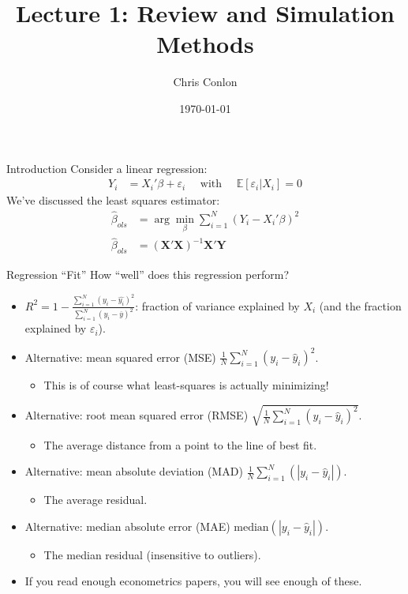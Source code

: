 \documentclass[aspectratio=169]{beamer}
\title{Lecture 1: Review and Simulation Methods}
\author{Chris Conlon }
\institute{NYU Stern }
\date{\today}
\begin{document}
\maketitle

\begin{frame}{Introduction}
Consider a linear regression:
\begin{align*}
Y_{i} &= X_{i}'\beta + \varepsilon_{i} \quad \text{ with } \quad \mathbb{E}[\varepsilon_i | X_i]=0 
\end{align*}
We've discussed the \alert{least squares estimator}:
\begin{align*}
\widehat{\beta}_{ols} &= \arg \min_{\beta} \sum_{i=1}^N (Y_i - X_i' \beta)^2\\
\widehat{\beta}_{ols} &= (\mathbf{X}'\mathbf{X})^{-1} \mathbf{X}' \mathbf{Y}
\end{align*}
\end{frame}


\begin{frame}{Regression ``Fit''}
How ``well'' does this regression perform?
\begin{itemize}
\item $R^2 = 1 - \frac{\sum_{i=1}^N (y_i-\hat{y_i})^2}{\sum_{i=1}^N (y_i-\overline{y})^2}$: fraction of variance explained by $X_i$ (and the fraction explained by $\varepsilon_i$).
\item Alternative: \alert{mean squared error} (MSE) $\frac{1}{N}\sum_{i=1}^N (y_i -\hat{y}_i)^2$.
\begin{itemize}
\item This is of course what least-squares is actually minimizing!
\end{itemize}
\item Alternative: \alert{root mean squared error} (RMSE) $\sqrt{\frac{1}{N}\sum_{i=1}^N (y_i -\hat{y}_i)^2}$.
\begin{itemize}
\item The average distance from a point to the line of best fit.
\end{itemize}
\item Alternative: \alert{mean absolute deviation} (MAD) $ \frac{1}{N} \sum_{i=1}^N \left(| y_i -\hat{y}_i | \right)$.
\begin{itemize}
\item The average residual.
\end{itemize}
\item Alternative: \alert{median absolute error} (MAE) $ \text{median}\left(| y_i -\hat{y}_i| \right)$.
\begin{itemize}
\item The median residual (insensitive to outliers).
\end{itemize}
\item If you read enough econometrics papers, you will see enough of these.
\end{itemize}
\end{frame}
\end{document}
